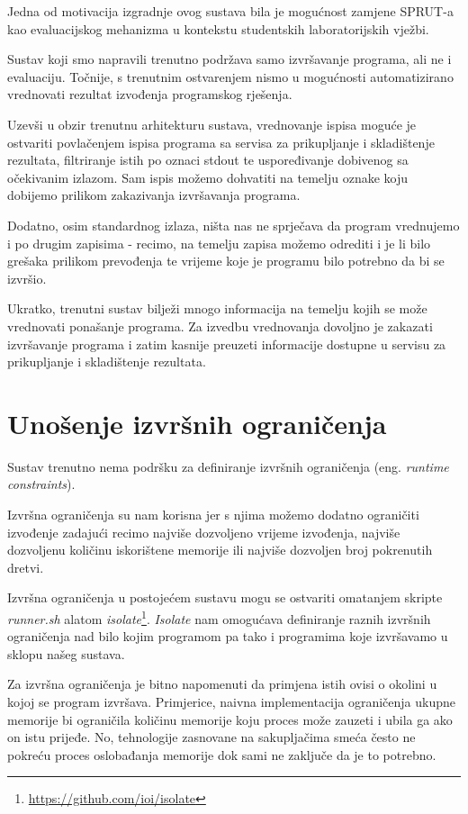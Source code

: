 \documentclass[times, utf8, zavrsni]{fer}
\begin{document}
Jedna od motivacija izgradnje ovog sustava bila je mogućnost zamjene SPRUT-a kao evaluacijskog mehanizma u kontekstu studentskih laboratorijskih vježbi.

Sustav koji smo napravili trenutno podržava samo izvršavanje programa, ali ne i evaluaciju. Točnije, s trenutnim ostvarenjem nismo u mogućnosti automatizirano vrednovati rezultat izvođenja programskog rješenja.

Uzevši u obzir trenutnu arhitekturu sustava, vrednovanje ispisa moguće je ostvariti povlačenjem ispisa programa sa servisa za prikupljanje i skladištenje rezultata, filtriranje istih po oznaci stdout te uspoređivanje dobivenog sa očekivanim izlazom. Sam ispis možemo dohvatiti na temelju oznake koju dobijemo prilikom zakazivanja izvršavanja programa.

Dodatno, osim standardnog izlaza, ništa nas ne sprječava da program vrednujemo i po drugim zapisima - recimo, na temelju zapisa možemo odrediti i je li bilo grešaka prilikom prevođenja te vrijeme koje je programu bilo potrebno da bi se izvršio.

Ukratko, trenutni sustav bilježi mnogo informacija na temelju kojih se može vrednovati ponašanje programa. Za izvedbu vrednovanja dovoljno je zakazati izvršavanje programa i zatim kasnije preuzeti informacije dostupne u servisu za prikupljanje i skladištenje rezultata.

\section{Unošenje izvršnih ograničenja}

Sustav trenutno nema podršku za definiranje izvršnih ograničenja (eng. {\textit{runtime constraints}}).

Izvršna ograničenja su nam korisna jer s njima možemo dodatno ograničiti izvođenje zadajući recimo najviše dozvoljeno vrijeme izvođenja, najviše dozvoljenu količinu iskorištene memorije ili najviše dozvoljen broj pokrenutih dretvi.

Izvršna ograničenja u postojećem sustavu mogu se ostvariti omatanjem skripte {\textit{runner.sh}} alatom {\textit{isolate}}\footnote{\url{https://github.com/ioi/isolate}}. {\textit{Isolate}} nam omogućava definiranje raznih izvršnih ograničenja nad bilo kojim programom pa tako i programima koje izvršavamo u sklopu našeg sustava.

Za izvršna ograničenja je bitno napomenuti da primjena istih ovisi o okolini u kojoj se program izvršava. Primjerice, naivna implementacija ograničenja ukupne memorije bi ograničila količinu memorije koju proces može zauzeti i ubila ga ako on istu prijeđe. No, tehnologije zasnovane na sakupljačima smeća često ne pokreću proces oslobađanja memorije dok sami ne zaključe da je to potrebno.
\end{document}
